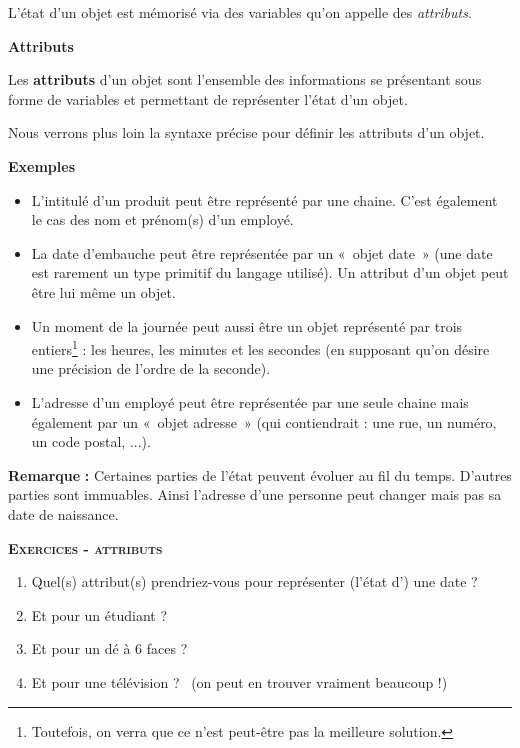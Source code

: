L'état d'un objet est mémorisé via des
variables qu'on appelle des \textit{attributs}.

\bigskip

{\sffamily\bfseries\upshape
Attributs}

Les \textbf{attributs} d'un objet sont
l'ensemble des informations se présentant sous forme
de variables et permettant de représenter l'état
d'un objet.

Nous verrons plus loin la syntaxe précise pour définir les attributs
d'un objet.

{
\textbf{Exemples} }

\liststyleListv
\begin{itemize}
	\item 
		L'intitulé d'un produit peut être
		représenté par une chaine. C'est également le cas des
		nom et prénom(s) d'un employé.
	\item 
		La date d'embauche peut être représentée par un «~objet
		date~» (une date est rarement un type primitif du langage utilisé). Un
		attribut d'un objet peut être lui même un objet.
	\item 
		Un moment de la journée peut aussi être un objet représenté par trois
		entiers\footnote{Toutefois, on verra que ce n'est
		peut-être pas la meilleure solution.} : les heures, les minutes et les
		secondes (en supposant qu'on désire une précision de
		l'ordre de la seconde).
	\item 
		L'adresse d'un employé peut être
		représentée par une seule chaine mais également par un «~objet
		adresse~» (qui contiendrait : une rue, un numéro, un code postal,
		...).
\end{itemize}

{\textbf{Remarque}\textbf{ : }Certaines parties de
l'état peuvent évoluer au fil du temps.
D'autres parties sont immuables. Ainsi
l'adresse d'une personne peut changer
mais pas sa date de naissance. }

{\sffamily\bfseries\scshape
Exercices - attributs}

\liststyleWWviiiNumi
\begin{enumerate}
	\item 
		Quel(s) attribut(s) prendriez-vous pour représenter
		(l'état d') une date ?
	\item 
		Et pour un étudiant ?
	\item 
		Et pour un dé à 6 faces ?
	\item 
		Et pour une télévision ? \ (on peut en trouver vraiment beaucoup !)
\end{enumerate}

